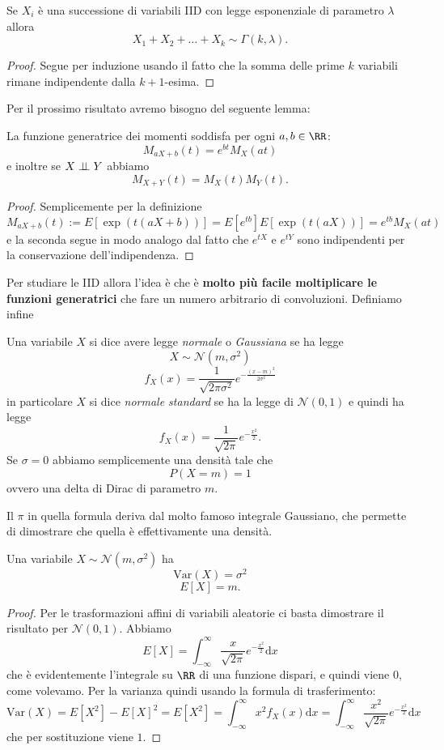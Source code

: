 \documentclass[11pt]{scrartcl}
\newcommand{\dif}{\text{d}}
\begin{document}
	\begin{proposition}
		Se $X_i$ è una successione di variabili IID con legge esponenziale di parametro $\lambda$ allora 
		$$X_1+X_2+\dots+X_k\sim \Gamma(k,\lambda).$$ 
	\end{proposition}
	\begin{proof}
		Segue per induzione usando il fatto che la somma delle prime $k$ variabili rimane indipendente dalla $k+1$-esima.
	\end{proof}
	Per il prossimo risultato avremo bisogno del seguente lemma:
	\begin{lemma}
		La funzione generatrice dei momenti soddisfa per ogni $a,b\in \RR$:
		$$M_{aX+b}(t)=e^{bt}M_X(at)$$
		e inoltre se $X \indep Y$ abbiamo
		$$M_{X+Y}(t)=M_X(t)M_Y(t).$$
	\end{lemma}
	\begin{proof}
		Semplicemente per la definizione
		$$M_{aX+b}(t):=E\left[\exp\left(t(aX+b)\right)\right]=E\left[e^{tb}\right]E\left[\exp(t(aX))\right]=e^{tb}M_{X}(at)$$
		e la seconda segue in modo analogo dal fatto che $e^{tX}$ e $e^{tY}$ sono indipendenti per la conservazione dell'indipendenza.
	\end{proof}
	Per studiare le IID allora l'idea è che è \textbf{molto più facile moltiplicare le funzioni generatrici} che fare un numero arbitrario di convoluzioni. Definiamo infine
	\begin{definition}
		Una variabile $X$ si dice avere legge \textit{normale} o \textit{Gaussiana} se ha legge
		$$X\sim \mathcal{N}(m,\sigma^2)$$
		$$f_X(x)=\frac{1}{\sqrt{2\pi \sigma^2}}e^{-\frac{(x-m)^2}{2\sigma^2}}$$
		in particolare $X$ si dice \textit{normale standard} se ha la legge di $\mathcal{N}(0,1)$ e quindi ha legge
		$$f_X(x)=\frac{1}{\sqrt{2\pi}}e^{-\frac{x^2}{2}}.$$
		Se $\sigma=0$ abbiamo semplicemente una densità tale che 
		$$P(X=m)=1$$
		ovvero una delta di Dirac di parametro $m$.
	\end{definition}
	Il $\pi$ in quella formula deriva dal molto famoso integrale Gaussiano, che permette di dimostrare che quella è effettivamente una densità. 
	\begin{lemma}
		Una variabile $X\sim \mathcal{N}(m,\sigma^2)$ ha 
		$$\text{Var}(X)=\sigma^2$$
		$$E\left[X\right]=m.$$
	\end{lemma}
	\begin{proof}
		Per le trasformazioni affini di variabili aleatorie ci basta dimostrare il risultato per $\mathcal{N}(0,1)$. Abbiamo 
		$$E[X]=\int_{-\infty}^\infty \frac{x}{\sqrt{2\pi}}e^{-\frac{x^2}{2}}\dif x$$
		che è evidentemente l'integrale su $\RR$ di una funzione dispari, e quindi viene $0$, come volevamo. Per la varianza quindi usando la formula di trasferimento:
		$$\text{Var}(X)=E[X^2]-E[X]^2=E[X^2]=\int_{-\infty}^{\infty}x^2f_X(x)\dif x=\int_{-\infty}^\infty \frac{x^2}{\sqrt{2\pi }}e^{-\frac{x^2}{2}}\dif x$$
		che per sostituzione viene $1$.
	\end{proof}
\end{document}

